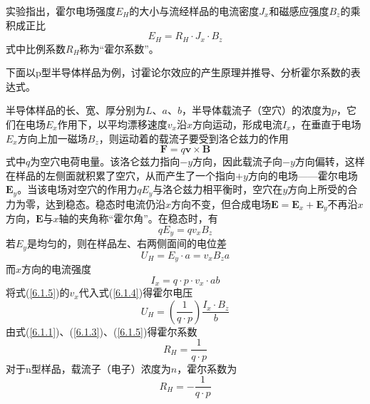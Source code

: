 \documentclass[a4paper]{article}
\begin{document}
实验指出，霍尔电场强度$E_H$的大小与流经样品的电流密度$J_x$和磁感应强度$B_z$的乘积成正比
\begin{equation}\label{6.1.1}
E_H=R_H \cdot J_x \cdot B_z 
\end{equation}
式中比例系数$R_H$称为“霍尔系数”。

下面以p型半导体样品为例，讨霍论尔效应的产生原理并推导、分析霍尔系数的表达式。

半导体样品的长、宽、厚分别为$L$、$a$、$b$，半导体载流子（空穴）的浓度为$p$，它们在电场$E_x$作用下，以平均漂移速度$v_x$沿$x$方向运动，形成电流$I_x$，在垂直于电场$E_x$方向上加一磁场$B_z$，则运动着的载流子要受到洛仑兹力的作用
\begin{equation}\label{6.1.2}
\bm{F}=q\bm{v} \times \bm{B}
\end{equation}
式中$q$为空穴电荷电量。该洛仑兹力指向$-y$方向，因此载流子向$-y$方向偏转，这样在样品的左侧面就积累了空穴，从而产生了一个指向$+y$方向的电场——霍尔电场$\bm{E}_y$。当该电场对空穴的作用力$q E_y$与洛仑兹力相平衡时，空穴在$y$方向上所受的合力为零，达到稳态。稳态时电流仍沿$x$方向不变，但合成电场$\bm{E}=\bm{E}_x+\bm{E}_y$不再沿$x$方向，$\bm{E}$与$x$轴的夹角称“霍尔角”。在稳态时，有
\begin{equation}\label{6.1.3}
qE_y=qv_x B_z
\end{equation}
若$E_y$是均匀的，则在样品左、右两侧面间的电位差
\begin{equation}\label{6.1.4}
U_H=E_y\cdot a=v_x B_z a
\end{equation}
而$x$方向的电流强度
\begin{equation}\label{6.1.5}
I_x=q\cdot p\cdot v_x\cdot ab
\end{equation}
将式(\ref{6.1.5})的$v_x$代入式(\ref{6.1.4})得霍尔电压
\begin{equation}\label{6.1.6}
U_H=(\frac{1}{q\cdot p})\frac{I_x\cdot B_z}{b}
\end{equation}
由式(\ref{6.1.1})、(\ref{6.1.3})、(\ref{6.1.5})得霍尔系数
\begin{equation}\label{6.1.7}
R_H=\frac{1}{q\cdot p}
\end{equation}
对于n型样品，载流子（电子）浓度为$n$，霍尔系数为
\begin{equation}\label{6.1.8}
R_H=-\frac{1}{q\cdot p}
\end{equation}
\end{document}
